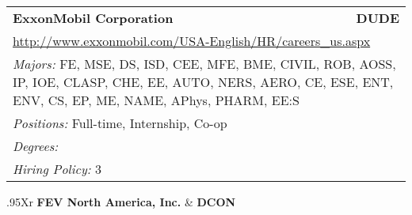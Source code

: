 \documentclass[twoside]{article}
\begin{document}
\begin{center}
\begin{multicols}{3}
\begin{FlushLeft}
\begin{minipage}{.9\columnwidth}
\end{minipage}
 
\begin{minipage}{.9\columnwidth}\begin{tabularx}{.95\columnwidth}{Xr}
                 {\Large\bf ExxonMobil Corporation} & {\Large\bf DUDE}\\
    \multicolumn{2}{p{.95\columnwidth}}{\url{http://www.exxonmobil.com/USA-English/HR/careers_us.aspx}}\\
    \multicolumn{2}{p{.95\columnwidth}}{\emph{Majors:} FE, MSE, DS, ISD, CEE, MFE, BME, CIVIL, ROB, AOSS, IP, IOE, CLASP, CHE, EE, AUTO, NERS, AERO, CE, ESE, ENT, ENV, CS, EP, ME, NAME, APhys, PHARM, EE:S}\\
    \multicolumn{2}{p{.95\columnwidth}}{\emph{Positions:} Full-time, Internship, Co-op}\\
    \multicolumn{2}{p{.95\columnwidth}}{\emph{Degrees:} }\\
    \multicolumn{2}{p{.95\columnwidth}}{\emph{Hiring Policy:} 3}\\
    \end{tabularx}
    
\end{minipage}
 
\begin{minipage}{.9\columnwidth}\begin{tabularx}{.95\columnwidth}{Xr}
                 {\Large\bf FEV North America, Inc.} & {\Large\bf DCON}\\
    \\
    \\
    \\
    \\
    \\
    \end{tabularx}
    
\end{minipage}
 

\end{FlushLeft}
\end{multicols}
\end{center}
\end{document}
